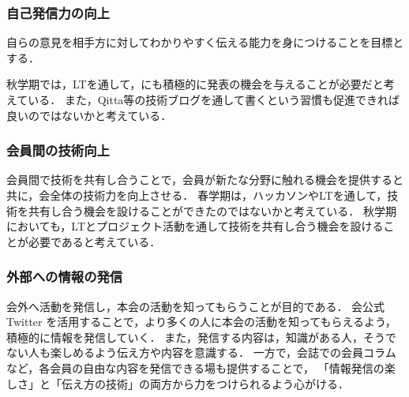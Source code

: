 \subsubsection*{自己発信力の向上}
自らの意見を相手方に対してわかりやすく伝える能力を身につけることを目標とする．

秋学期では，LTを通して，\firstGrade{}にも積極的に発表の機会を与えることが必要だと考えている．
また，Qitta等の技術ブログを通して書くという習慣も促進できれば良いのではないかと考えている．

\subsubsection*{会員間の技術向上}
会員間で技術を共有し合うことで，会員が新たな分野に触れる機会を提供すると共に，会全体の技術力を向上させる．
春学期は，ハッカソンやLTを通して，技術を共有し合う機会を設けることができたのではないかと考えている．
秋学期においても，LTとプロジェクト活動を通して技術を共有し合う機会を設けることが必要であると考えている．

\subsubsection*{外部への情報の発信}
会外へ活動を発信し，本会の活動を知ってもらうことが目的である．
会公式 Twitter を活用することで，より多くの人に本会の活動を知ってもらえるよう，積極的に情報を発信していく．
また，発信する内容は，知識がある人，そうでない人も楽しめるよう伝え方や内容を意識する．
一方で，会誌での会員コラムなど，各会員の自由な内容を発信できる場も提供することで，
「情報発信の楽しさ」と「伝え方の技術」の両方から力をつけられるよう心がける．